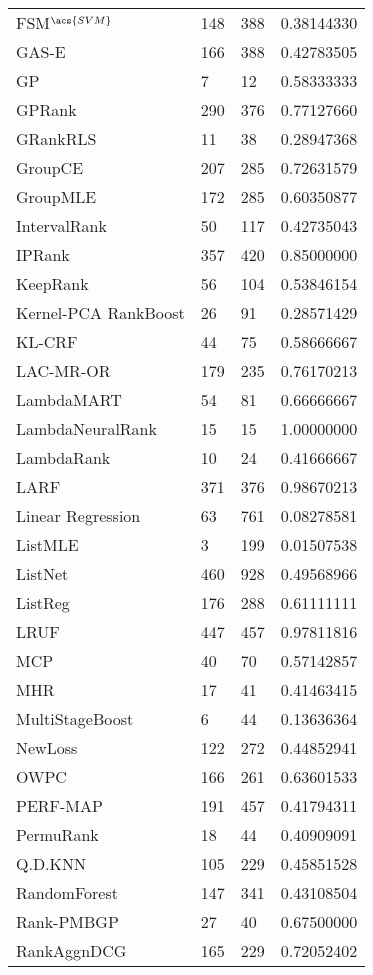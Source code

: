 \begin{longtable}{l|l|l|l}
FSM$^{\acs{SVM}}$ & 148 & 388 & 0.38144330 \\ 
GAS-E & 166 & 388 & 0.42783505 \\ 
\acs{GP} & 7 & 12 & 0.58333333 \\ 
\acs{GP}Rank & 290 & 376 & 0.77127660 \\ 
GRank\acs{RLS} & 11 & 38 & 0.28947368 \\ 
GroupCE & 207 & 285 & 0.72631579 \\ 
Group\acs{MLE} & 172 & 285 & 0.60350877 \\ 
IntervalRank & 50 & 117 & 0.42735043 \\ 
\acs{IP}Rank & 357 & 420 & 0.85000000 \\ 
KeepRank & 56 & 104 & 0.53846154 \\ 
Kernel-\acs{PCA} RankBoost & 26 &  91 & 0.28571429 \\ 
KL-\acs{CRF} &  44 & 75 & 0.58666667 \\ 
LAC-MR-OR & 179 & 235  & 0.76170213 \\ 
LambdaMART & 54 & 81 & 0.66666667 \\ 
LambdaNeuralRank & 15 & 15 & 1.00000000 \\ 
LambdaRank & 10 & 24 & 0.41666667 \\ 
LARF & 371 & 376 & 0.98670213 \\ 
Linear Regression & 63 & 761  & 0.08278581 \\ 
ListMLE & 3 & 199 & 0.01507538 \\ 
ListNet & 460 & 928 & 0.49568966 \\ 
ListReg & 176 & 288 & 0.61111111 \\ 
LRUF & 447 & 457 & 0.97811816 \\ 
MCP & 40 & 70 & 0.57142857 \\ 
MHR & 17 & 41 & 0.41463415 \\ 
MultiStageBoost & 6  & 44 & 0.13636364 \\ 
NewLoss & 122 & 272 & 0.44852941 \\ 
OWPC & 166 & 261 & 0.63601533 \\ 
PERF-\acs{MAP} & 191 & 457 & 0.41794311 \\ 
PermuRank & 18 & 44 & 0.40909091 \\ 
Q.D.\acs{KNN} & 105 & 229 & 0.45851528 \\ 
RandomForest & 147 & 341 & 0.43108504 \\ 
Rank-PMBGP & 27 & 40 & 0.67500000 \\ 
RankAgg\acs{nDCG} & 165 & 229 & 0.72052402 \\ 

\end{longtable}
